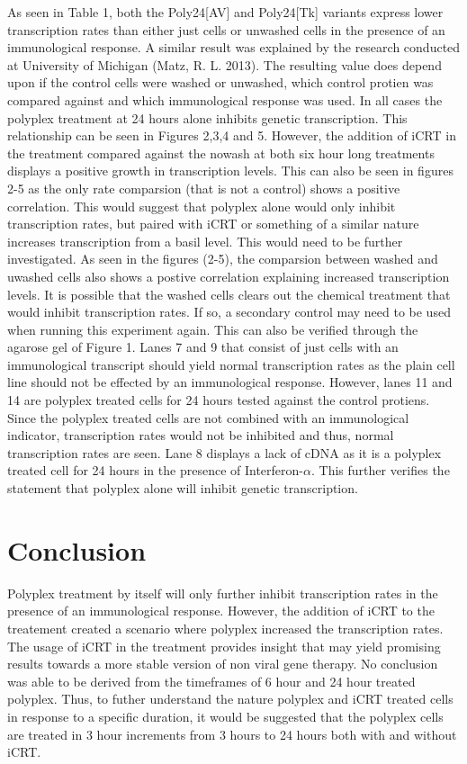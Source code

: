 \documentclass[journal, a4paper]{IEEEtran}
\begin{document}
    As seen in Table 1, both the Poly24[AV] and Poly24[Tk] variants express lower transcription rates
    than either just cells or unwashed cells in the presence of an immunological response.
    A similar result was explained by the research conducted at University of Michigan (Matz, R. L. 2013).
    The resulting value does depend upon if the control cells were washed or unwashed, which control
    protien was compared against and which immunological response was used. In all cases the
    polyplex treatment at 24 hours alone inhibits genetic transcription.
    This relationship can be seen in Figures 2,3,4 and 5. However,
    the addition of iCRT in the treatment compared against the nowash at both six hour long treatments
    displays a positive growth in transcription levels. This can also be seen in figures 2-5 as the
    only rate comparsion (that is not a control) shows a positive correlation. This would suggest that polyplex alone
    would only inhibit transcription rates, but paired with iCRT or something of a similar nature
    increases transcription from a basil level. This would need to be further investigated.
    As seen in the figures (2-5), the comparsion between washed and uwashed cells also shows a postive correlation
    explaining increased transcription levels. It is possible that the washed cells
    clears out the chemical treatment that would inhibit transcription rates. If so, a secondary
    control may need to be used when running this experiment again.
    This can also be verified through the agarose gel of Figure 1. Lanes 7 and 9
    that consist of just cells with an immunological transcript should yield normal
    transcription rates as the plain cell line should not be effected by an immunological response.
    However, lanes 11 and 14 are polyplex treated cells for 24 hours tested against the control protiens.
    Since the polyplex treated cells are not combined with an immunological indicator, transcription
    rates would not be inhibited and thus, normal transcription rates are seen.
    Lane 8 displays a lack of cDNA as it is a polyplex treated cell for 24 hours in the presence
    of Interferon-$\alpha$. This further verifies the statement that polyplex alone will inhibit genetic transcription.

  \section{Conclusion}

    Polyplex treatment by itself will only further inhibit transcription rates in the presence of an immunological response.
    However, the addition of iCRT to the treatement created a scenario where polyplex increased the
    transcription rates. The usage of iCRT in the treatment provides insight that may yield promising results towards
    a more stable version of non viral gene therapy. No conclusion was able to be derived from the timeframes of 6 hour
    and 24 hour treated polyplex. Thus, to futher understand the nature polyplex and iCRT treated cells in response to a specific duration,
    it would be suggested that the polyplex cells are treated in 3 hour increments from 3 hours to 24 hours both with and without iCRT.
\end{document}
